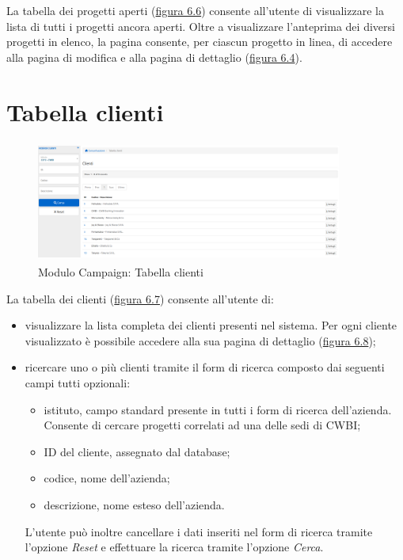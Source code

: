 \noindent La tabella dei progetti aperti ({\hyperref[fig:tabellaProgettiAperti]{figura 6.6}}) consente all'utente di visualizzare la lista di tutti i progetti ancora aperti. Oltre a visualizzare l'anteprima dei diversi progetti in elenco, la pagina consente, per ciascun progetto in linea, di accedere alla pagina di modifica e alla pagina di dettaglio ({\hyperref[fig:dettaglioProgetto]{figura 6.4}}).  

\section{Tabella clienti}
\begin{figure}[!h]
\centering
\includegraphics[width=380px, height=150px]{../images/UI/08-tabellaClienti.png}
\caption{Modulo Campaign: Tabella clienti}
\label{fig:tabellaClienti}
\end{figure}

\noindent La tabella dei clienti ({\hyperref[fig:tabellaClienti]{figura 6.7}}) consente all'utente di:
\begin{itemize}
\item visualizzare la lista completa dei clienti presenti nel sistema. Per ogni cliente visualizzato è possibile accedere alla sua pagina di dettaglio ({\hyperref[fig:dettaglioCliente1]{figura 6.8}}); 
\item ricercare uno o più clienti tramite il form di ricerca composto dai seguenti campi tutti opzionali:
\begin{itemize}
\item istituto, campo standard presente in tutti i form di ricerca dell'azienda. Consente di cercare progetti correlati ad una delle sedi di CWBI;
\item ID del cliente, assegnato dal database;
\item codice, nome dell'azienda;
\item descrizione, nome esteso dell'azienda.
\end{itemize}
L'utente può inoltre cancellare i dati inseriti nel form di ricerca tramite l'opzione \textit{Reset} e effettuare la ricerca tramite l'opzione \textit{Cerca}.
\end{itemize}

